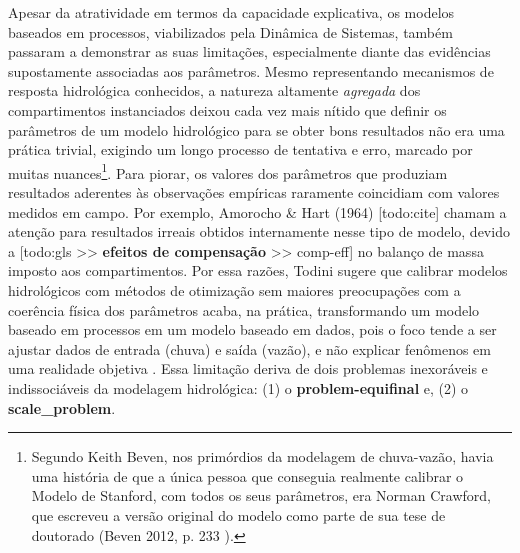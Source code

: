 \documentclass[./main.tex]{subfiles}
\begin{document}
\par Apesar da atratividade em termos da capacidade explicativa, os modelos baseados em processos, viabilizados pela Dinâmica de Sistemas, também passaram a demonstrar as suas limitações, especialmente diante das evidências supostamente associadas aos parâmetros. Mesmo representando mecanismos de resposta hidrológica conhecidos, a natureza altamente \textit{agregada} dos compartimentos instanciados deixou cada vez mais nítido que definir os parâmetros de um modelo hidrológico para se obter bons resultados não era uma prática trivial, exigindo um longo processo de tentativa e erro, marcado por muitas nuances\footnote{Segundo Keith Beven, nos primórdios da modelagem de chuva-vazão, havia uma história de que a única pessoa que conseguia realmente calibrar o Modelo de Stanford, com todos os seus parâmetros, era Norman Crawford, que escreveu a versão original do modelo como parte de sua tese de doutorado (Beven 2012, p. 233 \cite{Beven2012}).}. Para piorar, os valores dos parâmetros que produziam resultados aderentes às observações empíricas raramente coincidiam com valores medidos em campo. Por exemplo, Amorocho \& Hart (1964) [todo:cite] chamam a atenção para resultados irreais obtidos internamente nesse tipo de modelo, devido a [todo:gls >> \textbf{efeitos de compensação} >> comp-eff] no balanço de massa imposto aos compartimentos. Por essa razões, Todini sugere que calibrar modelos hidrológicos com métodos de otimização sem maiores preocupações com a coerência física dos parâmetros acaba, na prática, transformando um modelo baseado em processos em um modelo baseado em dados, pois o foco tende a ser ajustar dados de entrada (chuva) e saída (vazão), e não explicar fenômenos em uma realidade objetiva \cite{Todini2007a}. Essa limitação deriva de dois problemas inexoráveis e indissociáveis da modelagem hidrológica: (1) o \textbf{\gls{problem-equifinal}} e, (2) o \textbf{\gls{scale_problem}}. 
\end{document}
